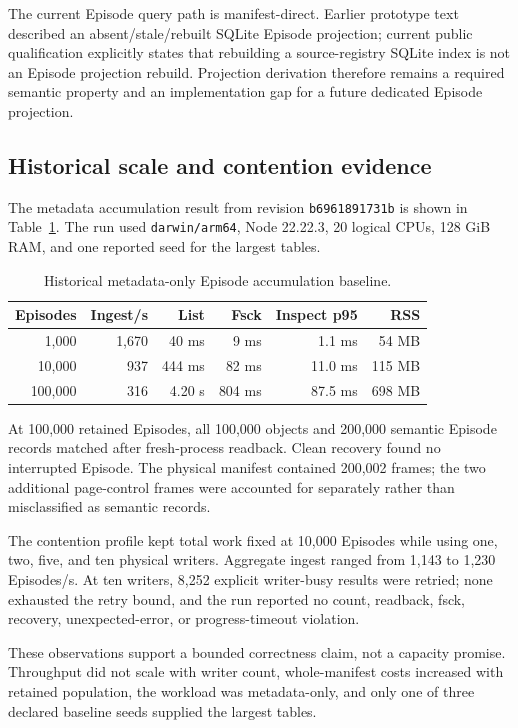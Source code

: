 The current Episode query path is manifest-direct. Earlier prototype text
described an absent/stale/rebuilt SQLite Episode projection; current public
qualification explicitly states that rebuilding a source-registry SQLite index
is not an Episode projection rebuild. Projection derivation therefore remains a
required semantic property and an implementation gap for a future dedicated
Episode projection.

\subsection{Historical scale and contention evidence}

The metadata accumulation result from revision \texttt{b6961891731b} is shown
in Table~\ref{tab:episode-scale}. The run used \texttt{darwin/arm64}, Node
22.22.3, 20 logical CPUs, 128 GiB RAM, and one reported seed for the largest
tables.

\begin{table}[ht]
\centering
\small
\begin{tabular}{rrrrrr}
\toprule
Episodes & Ingest/s & List & Fsck & Inspect p95 & RSS \\
\midrule
1,000 & 1,670 & 40 ms & 9 ms & 1.1 ms & 54 MB \\
10,000 & 937 & 444 ms & 82 ms & 11.0 ms & 115 MB \\
100,000 & 316 & 4.20 s & 804 ms & 87.5 ms & 698 MB \\
\bottomrule
\end{tabular}
\caption{Historical metadata-only Episode accumulation baseline.}
\label{tab:episode-scale}
\end{table}

At 100,000 retained Episodes, all 100,000 objects and 200,000 semantic Episode
records matched after fresh-process readback. Clean recovery found no
interrupted Episode. The physical manifest contained 200,002 frames; the two
additional page-control frames were accounted for separately rather than
misclassified as semantic records.

The contention profile kept total work fixed at 10,000 Episodes while using
one, two, five, and ten physical writers. Aggregate ingest ranged from 1,143 to
1,230 Episodes/s. At ten writers, 8,252 explicit writer-busy results were
retried; none exhausted the retry bound, and the run reported no count,
readback, fsck, recovery, unexpected-error, or progress-timeout violation.

These observations support a bounded correctness claim, not a capacity promise.
Throughput did not scale with writer count, whole-manifest costs increased with
retained population, the workload was metadata-only, and only one of three
declared baseline seeds supplied the largest tables.

